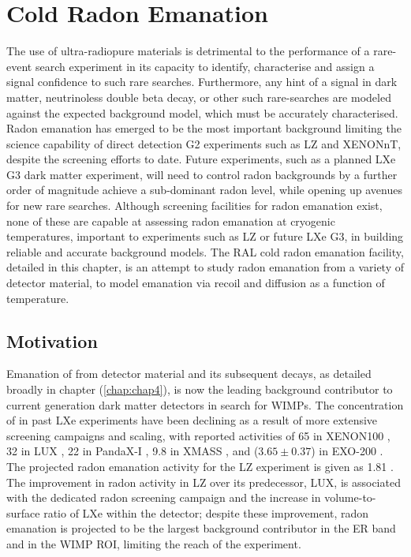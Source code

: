 \chapter{Cold Radon Emanation}
\label{chap:chap7}

The use of ultra-radiopure materials is detrimental to the performance of a rare-event search experiment in its capacity to identify, characterise and assign a signal confidence to such rare searches. Furthermore, any hint of a signal in dark matter, neutrinoless double beta decay, or other such rare-searches are modeled against the expected background model, which must be accurately characterised. Radon emanation has emerged to be the most important background limiting the science capability of direct detection G2 experiments such as LZ and XENONnT, despite the screening efforts to date. Future experiments, such as a planned LXe G3 dark matter experiment, will need to control radon backgrounds by a further order of magnitude achieve a sub-dominant radon level, while opening up avenues for new rare searches. Although screening facilities for radon emanation exist, none of these are capable at assessing radon emanation at cryogenic temperatures, important to experiments such as LZ or future LXe G3, in building reliable and accurate background models. The RAL cold radon emanation facility, detailed in this chapter, is an attempt to study radon emanation from a variety of detector material, to model emanation via recoil and diffusion as a function of temperature.
 
 
\section{Motivation}
\label{sec:motivation_7}

Emanation of \RnTTT{} from detector material and its subsequent decays, as detailed broadly in chapter (\ref{chap:chap4}), is now the leading background contributor to current generation dark matter detectors in search for WIMPs. The concentration of \RnTTT{} in past LXe experiments have been declining as a result of more extensive screening campaigns and scaling, with reported activities of 65 \uBqkg{} in XENON100 \cite{Aprile:2012nq}, 32 \uBqkg{} in LUX \cite{Akerib:2013tjd}, 22 \uBqkg{} in PandaX-I \cite{Xiao:2014xyn}, 9.8 \uBqkg{} in XMASS \cite{Abe:2013tc}, and ($3.65\pm0.37$) \uBqkg{} in EXO-200 \cite{Albert:2015nta}. The projected radon emanation activity for the LZ experiment is given as 1.81 \uBqkg{}. The improvement in radon activity in LZ over its predecessor, LUX, is associated with the dedicated radon screening campaign \cite{lz_screening} and the increase in volume-to-surface ratio of LXe within the detector; despite these improvement, radon emanation is projected to be the largest background contributor in the ER band and in the WIMP ROI, limiting the reach of the experiment. 

